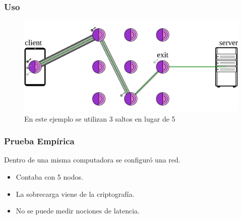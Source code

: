 \documentclass{beamer}
\newcommand{\vspc}{\vspace{0.5cm}}
\begin{document}
\begin{frame}
    \frametitle{Uso}

    \begin{figure}[h]
        \centering
        \includegraphics[scale=0.3]{circuitDiagram.png}
        \caption{En este ejemplo se utilizan 3 saltos en lugar de 5}
    \end{figure}
    
\end{frame}

\begin{frame}
    \frametitle{Prueba Empírica}

    Dentro de una misma computadora se configuró una red.

    \vspc

    \begin{itemize}
        \item Contaba con 5 nodos.
        \item La sobrecarga viene de la criptografía.
        \item No se puede medir nociones de latencia.
    \end{itemize}
\end{frame}
\end{document}
